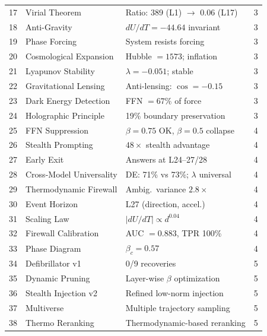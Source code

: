 \documentclass[11pt,a4paper]{article}
\begin{document}
\begin{center}
\begin{longtable}{@{}clll@{}}
\midrule
17 & Virial Theorem             & Ratio: 389 (L1) $\to$ 0.06 (L17)        & 3 \\
18 & Anti-Gravity               & $dU/dT = -44.64$ invariant               & 3 \\
19 & Phase Forcing              & System resists forcing                   & 3 \\
20 & Cosmological Expansion     & Hubble $= 1573$; inflation               & 3 \\
21 & Lyapunov Stability         & $\lambda = -0.051$; stable               & 3 \\
22 & Gravitational Lensing      & Anti-lensing: $\cos = -0.15$             & 3 \\
23 & Dark Energy Detection      & FFN $= 67\%$ of force                    & 3 \\
24 & Holographic Principle      & 19\% boundary preservation               & 3 \\
\midrule
25 & FFN Suppression            & $\beta=0.75$ OK, $\beta=0.5$ collapse    & 4 \\
26 & Stealth Prompting          & $48\times$ stealth advantage             & 4 \\
27 & Early Exit                 & Answers at L24--27/28                    & 4 \\
28 & Cross-Model Universality   & DE: 71\% vs 73\%; $\lambda$ universal    & 4 \\
29 & Thermodynamic Firewall     & Ambig.\ variance $2.8\times$             & 4 \\
30 & Event Horizon              & L27 (direction, accel.)                  & 4 \\
31 & Scaling Law                & $|dU/dT| \propto d^{0.04}$               & 4 \\
32 & Firewall Calibration       & AUC $= 0.883$, TPR 100\%                & 4 \\
33 & Phase Diagram              & $\beta_c = 0.57$                         & 4 \\
\midrule
34 & Defibrillator v1           & 0/9 recoveries                           & 5 \\
35 & Dynamic Pruning            & Layer-wise $\beta$ optimization          & 5 \\
36 & Stealth Injection v2       & Refined low-norm injection               & 5 \\
37 & Multiverse                 & Multiple trajectory sampling             & 5 \\
38 & Thermo Reranking           & Thermodynamic-based reranking            & 5 \\

\end{longtable}
\end{center}
\end{document}

